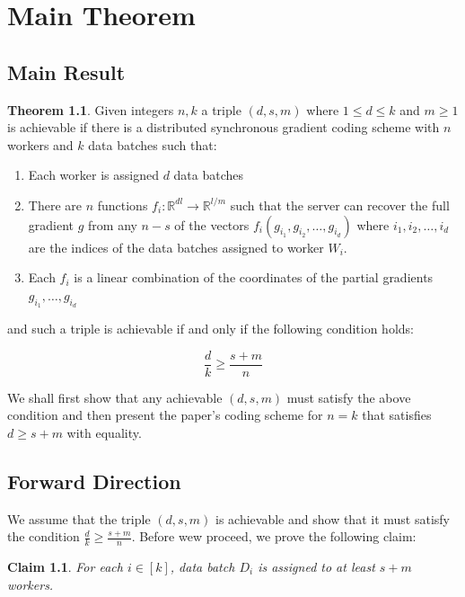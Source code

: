 \documentclass{report}
\newtheorem{claim}{Claim}
\theoremstyle{definition}
\newtheorem{theorem}{Theorem}
\begin{document}
\chapter{Main Theorem}

\section{Main Result}

\begin{theorem}
    Given integers $n, k$ a triple $(d, s, m)$ where $1 \leq d \leq k$ and $m \geq 1$ is achievable if there is a distributed synchronous gradient coding scheme with $n$ workers and $k$ data batches such that:

    \begin{enumerate}
        \item Each worker is assigned $d$ data batches
        \item There are $n$ functions $f_i: \mathbb{R}^{dl} \to \mathbb{R}^{l/m}$ such that the server can recover the full gradient $g$ from any $n-s$ of the vectors $f_i(g_{i_1}, g_{i_2}, \ldots, g_{i_d})$ where $i_1, i_2, \ldots, i_d$ are the indices of the data batches assigned to worker $W_i$.
        \item Each $f_i$ is a linear combination of the coordinates of the partial gradients $g_{i_1}, \ldots, g_{i_d}$
    \end{enumerate}

    \noindent 
    and such a triple is achievable if and only if the following condition holds:

    \begin{equation}
        \frac{d}{k} \geq \frac{s+m}{n}
    \end{equation}
\end{theorem}

We shall first show that any achievable $(d, s, m)$ must satisfy the above condition and then present the paper's coding scheme for $n = k$ that satisfies $d \geq s + m$ with equality.

\section{Forward Direction}

We assume that the triple $(d, s, m)$ is achievable and show that it must satisfy the condition $\frac{d}{k} \geq \frac{s+m}{n}$. Before wew proceed, we prove the following claim:
\begin{claim}
    For each $i \in [k]$, data batch $D_i$ is assigned to at least $s + m$ workers.
\end{claim}
\end{document}
